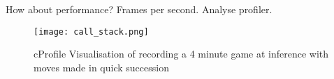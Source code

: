How about performance?
Frames per second.  Analyse profiler.

\begin{figure}[h]
    \centering
    \texttt{[image: call\_stack.png]}
    \caption{cProfile Visualisation of recording a 4 minute game at inference with moves made in quick succession}
    \label{fig:profile}
\end{figure}
